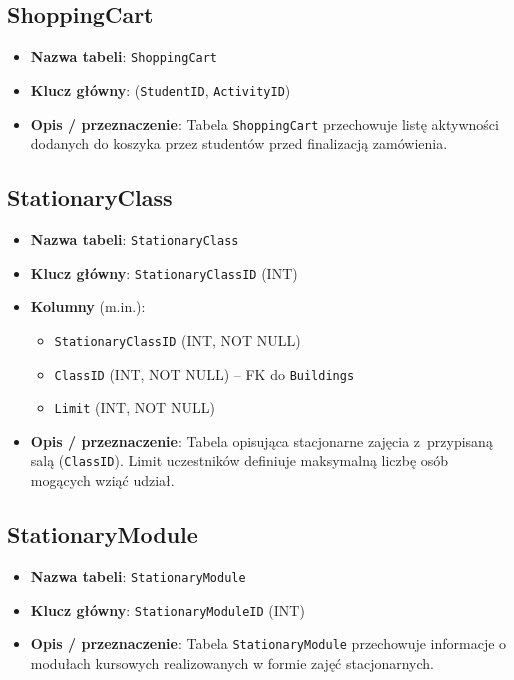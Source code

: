 \documentclass[12pt]{article}
\begin{document}
\subsection{ShoppingCart}
\begin{itemize}
    \item \textbf{Nazwa tabeli}: \texttt{ShoppingCart}
    \item \textbf{Klucz główny}: (\texttt{StudentID}, \texttt{ActivityID})
    \item \textbf{Opis / przeznaczenie}:  
          Tabela \texttt{ShoppingCart} przechowuje listę aktywności dodanych do koszyka przez studentów przed finalizacją zamówienia.
\end{itemize}

\subsection{StationaryClass}
\begin{itemize}
    \item \textbf{Nazwa tabeli}: \texttt{StationaryClass}
    \item \textbf{Klucz główny}: \texttt{StationaryClassID} (INT)
    \item \textbf{Kolumny} (m.in.):
          \begin{itemize}
            \item \texttt{StationaryClassID} (INT, NOT NULL)
            \item \texttt{ClassID} (INT, NOT NULL) -- FK do \texttt{Buildings}
            \item \texttt{Limit} (INT, NOT NULL)
          \end{itemize}
    \item \textbf{Opis / przeznaczenie}:  
          Tabela opisująca stacjonarne zajęcia z~przypisaną salą (\texttt{ClassID}). 
          Limit uczestników definiuje maksymalną liczbę osób mogących wziąć udział.
\end{itemize}

\subsection{StationaryModule}
\begin{itemize}
    \item \textbf{Nazwa tabeli}: \texttt{StationaryModule}
    \item \textbf{Klucz główny}: \texttt{StationaryModuleID} (INT)
    \item \textbf{Opis / przeznaczenie}:  
          Tabela \texttt{StationaryModule} przechowuje informacje o modułach kursowych realizowanych w formie zajęć stacjonarnych.
\end{itemize}
\end{document}

